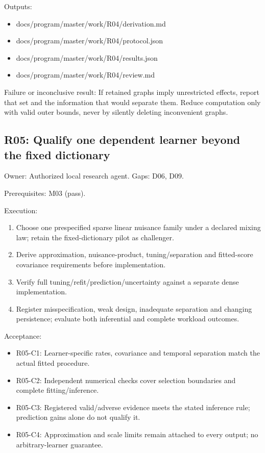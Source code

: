 \documentclass[
  11pt,
  a4paper,
]{article}
\providecommand{\tightlist}{%
  \setlength{\itemsep}{0pt}\setlength{\parskip}{0pt}}
\begin{document}
Outputs:

\begin{itemize}
\tightlist
\item
  docs/program/master/work/R04/derivation.md
\item
  docs/program/master/work/R04/protocol.json
\item
  docs/program/master/work/R04/results.json
\item
  docs/program/master/work/R04/review.md
\end{itemize}

Failure or inconclusive result: If retained graphs imply unrestricted
effects, report that set and the information that would separate them.
Reduce computation only with valid outer bounds, never by silently
deleting inconvenient graphs.

\hypertarget{r05-qualify-one-dependent-learner-beyond-the-fixed-dictionary}{%
\subsection{R05: Qualify one dependent learner beyond the fixed
dictionary}\label{r05-qualify-one-dependent-learner-beyond-the-fixed-dictionary}}

Owner: Authorized local research agent. Gaps: D06, D09.

Prerequisites: M03 (pass).

Execution:

\begin{enumerate}
\def\labelenumi{\arabic{enumi}.}
\tightlist
\item
  Choose one prespecified sparse linear nuisance family under a declared
  mixing law; retain the fixed-dictionary pilot as challenger.
\item
  Derive approximation, nuisance-product, tuning/separation and
  fitted-score covariance requirements before implementation.
\item
  Verify full tuning/refit/prediction/uncertainty against a separate
  dense implementation.
\item
  Register misspecification, weak design, inadequate separation and
  changing persistence; evaluate both inferential and complete workload
  outcomes.
\end{enumerate}

Acceptance:

\begin{itemize}
\tightlist
\item
  R05-C1: Learner-specific rates, covariance and temporal separation
  match the actual fitted procedure.
\item
  R05-C2: Independent numerical checks cover selection boundaries and
  complete fitting/inference.
\item
  R05-C3: Registered valid/adverse evidence meets the stated inference
  rule; prediction gains alone do not qualify it.
\item
  R05-C4: Approximation and scale limits remain attached to every
  output; no arbitrary-learner guarantee.
\end{itemize}
\end{document}
